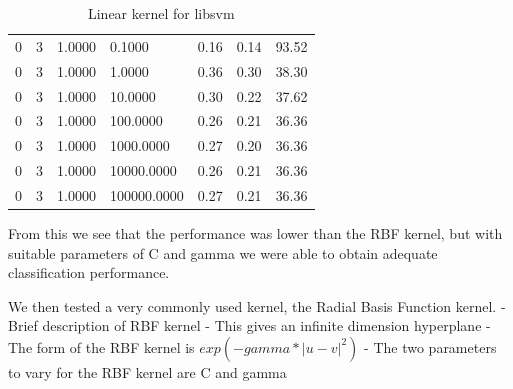 \documentclass[12pt,oneside]{book}
\begin{document}
\begin{table}
\begin{tabular}{|l|l|l|l|l|l|l|}
0               & 3               & 1.0000          & 0.1000          & 0.16            & 0.14            & 93.52           \\
0               & 3               & 1.0000          & 1.0000          & 0.36            & 0.30            & 38.30           \\
0               & 3               & 1.0000          & 10.0000         & 0.30            & 0.22            & 37.62           \\
0               & 3               & 1.0000          & 100.0000        & 0.26            & 0.21            & 36.36           \\
0               & 3               & 1.0000          & 1000.0000       & 0.27            & 0.20            & 36.36           \\
0               & 3               & 1.0000          & 10000.0000      & 0.26            & 0.21            & 36.36           \\
0               & 3               & 1.0000          & 100000.0000     & 0.27            & 0.21            & 36.36           \\



\hline
\end{tabular}
\caption{Linear kernel for libsvm}
\label{table:obv-6-libsvm-linear}
\end{table}

From this we see that the performance was lower than the RBF kernel,
but with suitable parameters of C and gamma we were able to obtain
adequate classification performance.

%
%

We then tested a very commonly used kernel, the Radial Basis Function kernel.  
- Brief description of RBF kernel
- This gives an infinite dimension hyperplane
- The form of the RBF kernel is $exp(-gamma*|u-v|^2)$
- The two parameters to vary for the RBF kernel are C and gamma
\end{document}
